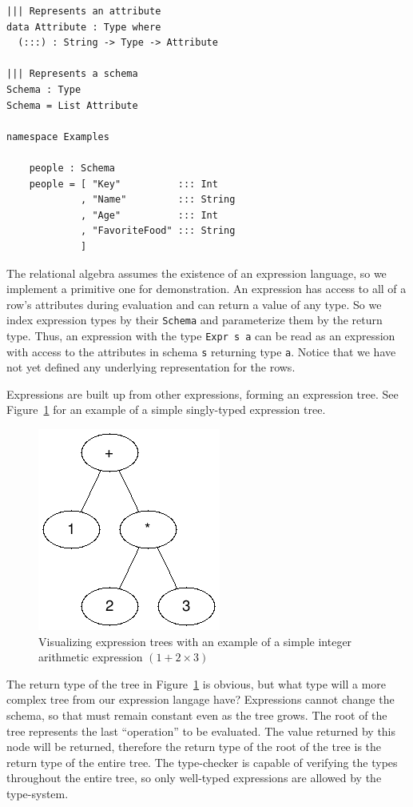 \documentclass[12pt]{report}
\begin{document}
\begin{lstlisting}[caption={Representing attributes and schemas},label={lst:attrs_and_schemas}]
||| Represents an attribute
data Attribute : Type where
  (:::) : String -> Type -> Attribute

||| Represents a schema
Schema : Type
Schema = List Attribute

namespace Examples

    people : Schema
    people = [ "Key"          ::: Int
             , "Name"         ::: String
             , "Age"          ::: Int
             , "FavoriteFood" ::: String
             ]
\end{lstlisting}

The relational algebra assumes the existence of an expression language, so we implement a primitive one for demonstration.
An expression has access to all of a row's attributes during evaluation and can return a value of any type.
So we index expression types by their \texttt{Schema} and parameterize them by the return type.
Thus, an expression with the type \texttt{Expr s a} can be read as an expression with access to the attributes in schema \texttt{s} returning type \texttt{a}.
Notice that we have not yet defined any underlying representation for the rows.

Expressions are built up from other expressions, forming an expression tree.
See Figure~\ref{fig:expr_tree} for an example of a simple singly-typed expression tree.

\begin{figure}[h!]
    \centering
    \includegraphics[width=0.25\linewidth]{assets/expr_tree.png}
    \caption{Visualizing expression trees with an example of a simple integer arithmetic expression $(1 + 2 \times 3)$}
    \label{fig:expr_tree}
\end{figure}


The return type of the tree in Figure~\ref{fig:expr_tree} is obvious, but what type will a more complex tree from our expression langage have?
Expressions cannot change the schema, so that must remain constant even as the tree grows.
The root of the tree represents the last ``operation'' to be evaluated.
The value returned by this node will be returned, therefore the return type of the root of the tree is the return type of the entire tree.
The type-checker is capable of verifying the types throughout the entire tree, so only well-typed expressions are allowed by the type-system.
\end{document}
